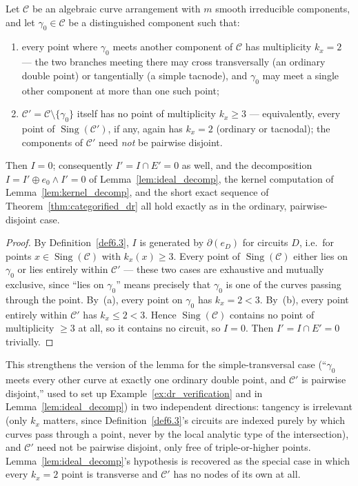 \documentclass[article,11pt]{amsart} \numberwithin{equation}{section}
\numberwithin{equation}{section}
\begin{document}
{\begin{lm}[Recursive stability under $k_x=2$ boundary data]
	\label{lem:simple_tacnodes}
	Let $\mathcal C$ be an algebraic curve arrangement with $m$ smooth
	irreducible components, and let $\gamma_0\in\mathcal C$ be a distinguished
	component such that:
	\begin{enumerate}
		\item every point where $\gamma_0$ meets another component of $\mathcal C$
		has multiplicity $k_x=2$ --- the two branches meeting there may cross
		transversally (an ordinary double point) or tangentially (a simple
		tacnode), and $\gamma_0$ may meet a single other component at more than one
		such point;
		\item $\mathcal C'=\mathcal C\setminus\{\gamma_0\}$ itself has no point of
		multiplicity $k_x\ge3$ --- equivalently, every point of $\operatorname{Sing}(\mathcal C')$,
		if any, again has $k_x=2$ (ordinary or tacnodal); the components of
		$\mathcal C'$ need \emph{not} be pairwise disjoint.
	\end{enumerate}
	Then $I=0$; consequently $I'=I\cap E'=0$ as well, and the decomposition
	$I=I'\oplus e_0\wedge I'=0$ of Lemma~\ref{lem:ideal_decomp}, the kernel computation of
	Lemma~\ref{lem:kernel_decomp}, and the short exact sequence of Theorem~\ref{thm:categorified_dr} all hold exactly as
	in the ordinary, pairwise-disjoint case.
\end{lm}

\begin{proof}
	By Definition~\ref{def6.3}, $I$ is generated by $\partial(e_D)$ for circuits $D$,
	i.e.\ for points $x\in\operatorname{Sing}(\mathcal C)$ with $k_x(x)\ge3$. Every point of
	$\operatorname{Sing}(\mathcal C)$ either lies on $\gamma_0$ or lies entirely within
	$\mathcal C'$ --- these two cases are exhaustive and mutually exclusive,
	since ``lies on $\gamma_0$'' means precisely that $\gamma_0$ is one of the
	curves passing through the point. By~(a), every point on $\gamma_0$ has
	$k_x=2<3$. By~(b), every point entirely within $\mathcal C'$ has $k_x\le2<3$.
	Hence $\operatorname{Sing}(\mathcal C)$ contains no point of multiplicity $\ge3$ at all,
	so it contains no circuit, so $I=0$. Then $I'=I\cap E'=0$ trivially.
\end{proof}

\begin{rk}
	This strengthens the version of the lemma for the simple-transversal case
	(``$\gamma_0$ meets every other curve at exactly one ordinary double point,
	and $\mathcal C'$ is pairwise disjoint,'' used to set up Example~\ref{ex:dr_verification} and in
	Lemma~\ref{lem:ideal_decomp}) in two independent directions: tangency is irrelevant (only
	$k_x$ matters, since Definition~\ref{def6.3}'s circuits are indexed purely by which
	curves pass through a point, never by the local analytic type of the
	intersection), and $\mathcal C'$ need not be pairwise disjoint, only free of
	triple-or-higher points. Lemma~\ref{lem:ideal_decomp}'s hypothesis is recovered as the special
	case in which every $k_x=2$ point is transverse and $\mathcal C'$ has no
	nodes of its own at all.
\end{rk}

}
\end{document}
